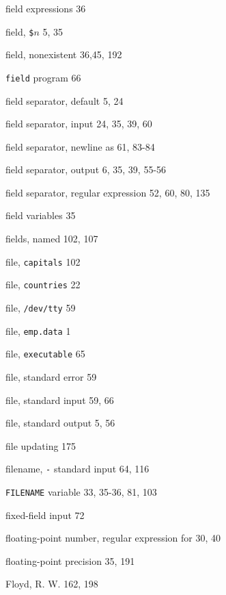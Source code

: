 \begin{multicols}{3}
\hangindent=4pc  field expressions 36

\hangindent=4pc  field, \verb'$'$n$ 5, 35

\hangindent=4pc  field, nonexistent 36,45, 192

\hangindent=4pc  \verb'field' program 66

\hangindent=4pc  field separator, default 5, 24

\hangindent=4pc  field separator, input 24, 35, 39, 60

\hangindent=4pc  field separator, newline as 61, 83-84

\hangindent=4pc  field separator, output 6, 35, 39, 55-56

\hangindent=4pc  field separator, regular expression 52, 60, 80, 135

\hangindent=4pc  field variables 35

\hangindent=4pc  fields, named 102, 107

\hangindent=4pc  file, \verb'capitals' 102

\hangindent=4pc  file, \verb'countries' 22

\hangindent=4pc  file, \verb'/dev/tty' 59

\hangindent=4pc  file, \verb'emp.data' 1

\hangindent=4pc  file, \verb'executable' 65

\hangindent=4pc  file, standard error 59

\hangindent=4pc  file, standard input 59, 66

\hangindent=4pc  file, standard output 5, 56

\hangindent=4pc  file updating 175

\hangindent=4pc  filename, \verb'-' standard input 64, 116

\hangindent=4pc  \verb'FILENAME' variable 33, 35-36, 81, 103

\hangindent=4pc  fixed-field input 72

\hangindent=4pc  floating-point number, regular expression for 30, 40

\hangindent=4pc  floating-point precision 35, 191

\hangindent=4pc  Floyd, R. W. 162, 198


\end{multicols}
